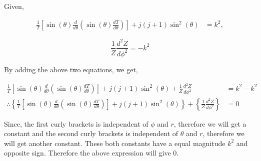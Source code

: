 \documentclass{article}
\begin{document}
\newpage
\subsection{}%
\large{
    \hspace{2cm} Given,

\begin{align*}
    \frac{1}{T} \left[ \sin(\theta) \frac{d}{d\theta} \left( \sin(\theta) \frac{d T}{d\theta} \right) \right] + j(j+1) \sin^2 (\theta) &= k^2 ,\tag{27}
\end{align*}

\begin{equation}\tag{28}
    \frac{1}{Z}\frac{d^2 Z}{d \phi^2} = -k^2
\end{equation}

By adding the above two equations, we get,

\begin{align*}
\frac{1}{T} \left[ \sin(\theta) \frac{d}{d\theta} \left( \sin(\theta) \frac{d T}{d\theta} \right) \right] + j(j+1) \sin^2 (\theta) + \frac{1}{Z}\frac{d^2 Z}{d \phi^2} & = k^2 - k^2 \\
\therefore \left\{ \frac{1}{T} \left[ \sin(\theta) \frac{d}{d\theta} \left( \sin(\theta) \frac{d T}{d\theta} \right) \right] + j(j+1) \sin^2 (\theta) \right\} + \left\{ \frac{1}{Z}\frac{d^2 Z}{d \phi^2} \right\}		& = 0
\end{align*}

Since, the first curly brackets is independent of $\phi$ and $r$, therefore we will get a constant and the second curly brackets is independent of $\theta$ and $r$, therefore we will get another constant. These both constants have a equal magnitude $k^2$ and opposite sign. Therefore the above expression will give $0$.
}

\newpage
\subsection{}%
\end{document}
